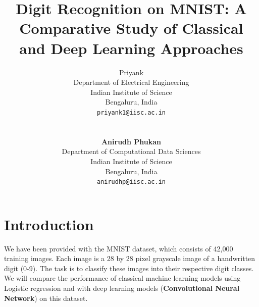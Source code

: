 \documentclass{article}
\title{Digit Recognition on MNIST: A Comparative Study of Classical and Deep Learning Approaches}
\author{%
  Priyank \\
  Department of Electrical Engineering\\
  Indian Institute of Science\\
  Bengaluru, India \\
  \texttt{priyank1@iisc.ac.in} \\
  \\
  \\
  \textbf{Anirudh Phukan} \\
  Department of Computational Data Sciences\\
  Indian Institute of Science\\
  Bengaluru, India \\
  \texttt{anirudhp@iisc.ac.in} \\
}
\begin{document}
\maketitle

\begin{abstract}
\end{abstract}
\section{Introduction}
We have been provided with the MNIST dataset, which consists of 42,000 training images. Each image is a 28 by 28 pixel grayscale image of a handwritten digit (0-9). The task is to classify these images into their respective digit classes. We will compare the performance of classical machine learning models using Logistic regression and with deep learning models (\textbf{Convolutional Neural Network}) on this dataset.
\end{document}
